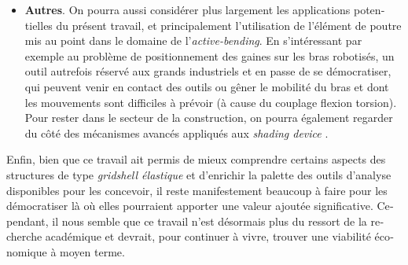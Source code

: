 \begin{otherlanguage}{french}
\begin{itemize}
\item 
    \textbf{Autres}. On pourra aussi considérer plus largement les applications potentielles du présent travail, et principalement l'utilisation de l'élément de poutre mis au point dans le domaine de l'\emph{active-bending}. En s'intéressant par exemple au problème de positionnement des gaines sur les bras robotisés, un outil autrefois réservé aux grands industriels et en passe de se démocratiser, qui peuvent venir en contact des outils ou gêner le mobilité du bras et dont les mouvements sont difficiles à prévoir (à cause du couplage flexion torsion). Pour rester dans le secteur de la construction, on pourra également regarder du côté des mécanismes avancés appliqués aux \emph{shading device} \cite{Charpentier2017}.

\end{itemize}

Enfin, bien que ce travail ait permis de mieux comprendre certains aspects des structures de type \emph{gridshell élastique} et d'enrichir la palette des outils d'analyse disponibles pour les concevoir, il reste manifestement beaucoup à faire pour les démocratiser là où elles pourraient apporter une valeur ajoutée significative. Cependant, il nous semble que ce travail n'est désormais plus du ressort de la recherche académique et devrait, pour continuer à vivre, trouver une viabilité économique à moyen terme.








\end{otherlanguage}
